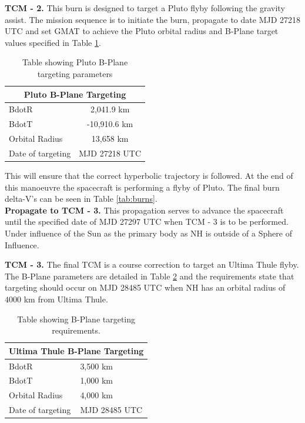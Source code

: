 \documentclass[11pt]{article}
\begin{document}
\textbf{TCM - 2.} This burn is designed to target a Pluto flyby following the gravity assist. The mission sequence is to initiate the burn, propagate to date MJD 27218 UTC and set GMAT to achieve the Pluto orbital radius and B-Plane target values specified in Table \ref{tab:pluto}.
\begin{table}[H]
\centering
\caption{Table showing Pluto B-Plane targeting parameters}
\begin{tabular}{lc}
\hline
\multicolumn{2}{c}{\cellcolor[HTML]{CBCEFB}Pluto B-Plane Targeting} \\ \hline
BdotR                              & 2,041.9 km                     \\
BdotT                              & -10,910.6 km                   \\ \hline
Orbital Radius                     & 13,658 km                      \\
Date of targeting                  & MJD 27218 UTC                  \\ \hline
\end{tabular}
\label{tab:pluto}
\end{table}
This will ensure that the correct hyperbolic trajectory is followed. At the end of this manoeuvre the spacecraft is performing a flyby of Pluto. The final burn delta-V's can be seen in Table \ref{tab:burns}.\\

\textbf{Propagate to TCM - 3.} This propagation serves to advance the spacecraft until the specified date of MJD 27297 UTC when TCM - 3 is to be performed. Under influence of the Sun as the primary body as NH is outside of a Sphere of Influence.

\textbf{TCM - 3.} The final TCM is a course correction to target an Ultima Thule flyby. The B-Plane parameters are detailed in Table \ref{tab:tcm3} and the requirements state that targeting should occur on MJD 28485 UTC when NH has an orbital radius of $4000$ km from Ultima Thule.

\begin{table}[H]
\centering
\caption{Table showing B-Plane targeting requirements.}
\begin{tabular}{ll}
\hline
\multicolumn{2}{c}{\cellcolor[HTML]{CBCEFB}Ultima Thule B-Plane Targeting} \\ \hline
BdotR                                  & 3,500 km                          \\
BdotT                                  & 1,000 km                          \\ \hline
Orbital Radius                         & 4,000 km                          \\
Date of targeting                      & MJD 28485 UTC                     \\ \hline
\end{tabular}
\label{tab:tcm3}
\end{table}
\end{document}
